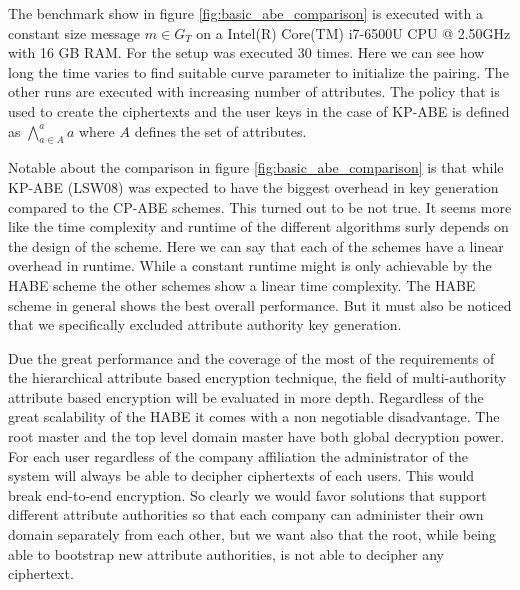 The  benchmark show in figure \ref{fig:basic_abe_comparison} is executed with a constant size message $m \in G_T$ on a Intel(R) Core(TM) i7-6500U CPU @ 2.50GHz with 16 GB RAM. For the setup was executed 30 times. Here we can see how long the time varies to find suitable curve parameter to initialize the pairing. The other runs are executed with increasing number of attributes. The policy that is used to create the ciphertexts and the user keys in the case of KP-ABE is defined as $\bigwedge\limits_{a \in A}^a a$ where $A$ defines the set of attributes. 

Notable about the comparison in figure \ref{fig:basic_abe_comparison} is that while \ac{KP-ABE} (LSW08) was expected to have the biggest overhead in key generation compared to the \ac{CP-ABE} schemes. This turned out to be not true. It seems more like the time complexity and runtime of the different algorithms surly depends on the design of the scheme. Here we can say that each of the schemes have a linear overhead in runtime. While a constant runtime might is only achievable by the HABE scheme the other schemes show a linear time complexity. The HABE scheme in general shows the best overall performance. But it must also be noticed that we specifically excluded attribute authority key generation. 

Due the great performance and the coverage of the most of the requirements of the hierarchical attribute based encryption technique, the field of multi-authority attribute based encryption will be evaluated in more depth. Regardless of the great scalability of the \ac{HABE} it comes with a non negotiable disadvantage. The root master and the top level domain master have both global decryption power. For each user regardless of the company affiliation the administrator of the system will always be able to decipher ciphertexts of each users. This would break end-to-end encryption. So clearly we would favor solutions that support different attribute authorities so that each company can administer their own domain separately from each other, but we want also that the root, while being able to bootstrap new attribute authorities, is not able to decipher any ciphertext. 
